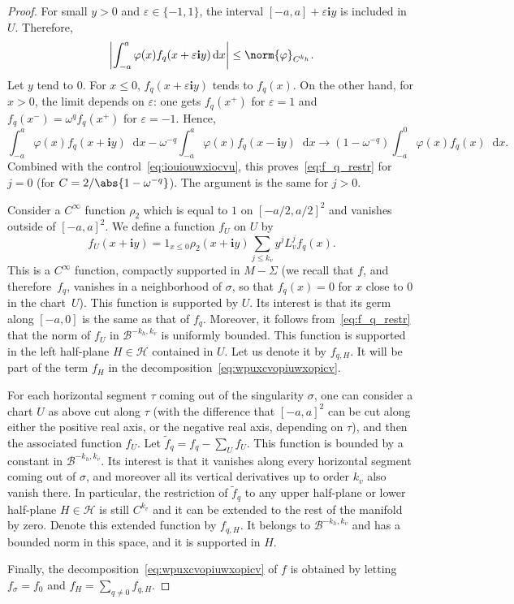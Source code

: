 \documentclass[JEP,XML,SOM,Unicode]{cedram}
\newcommand{\boH}{\mathcal{H}}
\newcommand{\boB}{\mathcal{B}}
\newcommand{\dd}{\mathop{}\!\mathrm{d}}
\newcommand{\ic}{\mathbf{i}}
\newcommand{\absgg}[1]{\biggl \lvert#1\biggr\rvert}
\let\epsilon\varepsilon
\let\phi\varphi
\theoremstyle{definition}
\numberwithin{equation}{section}
\begin{document}
\begin{proof}
For small $y>0$ and $\epsilon \in \{-1, 1\}$, the interval $[-a,a]+\epsilon
\ic y$ is included in $U$. Therefore,
\begin{equation}
\label{eq:iouiouwxiocvu}
\absgg{\int_{-a}^a \phi(x) f_q(x+\epsilon \ic y) \dd x} \leq \norm{\phi}_{C^{k_h}}.
\end{equation}
Let $y$ tend to $0$. For $x \leq 0$, $f_q(x+\epsilon \ic y)$ tends to
$f_q(x)$. On the other hand, for $x>0$, the limit depends on $\epsilon$: one
gets $f_q(x^+)$ for $\epsilon=1$ and $f_q(x^-) = \omega^q f_q(x^+)$ for
$\epsilon = -1$. Hence,
\begin{equation*}
\int_{-a}^a \phi(x) f_q(x+\ic y) \dd x - \omega^{-q} \int_{-a}^a \phi(x) f_q(x-\ic y) \dd x
\to (1-\omega^{-q}) \int_{-a}^0 \phi(x) f_q(x) \dd x.
\end{equation*}
Combined with the control~\eqref{eq:iouiouwxiocvu}, this
proves~\eqref{eq:f_q_restr} for $j=0$ (for $C=2/\abs{1-\omega^{-q}}$). The
argument is the same for $j>0$.

Consider a $C^\infty$ function $\rho_2$ which is equal to $1$ on $[-a/2,
a/2]^2$ and vanishes outside of $[-a,a]^2$. We define a function $f_U$ on $U$
by
\[
f_U(x+\ic y) = 1_{x\leq 0} \rho_2(x+\ic y) \sum_{j\leq k_v} y^j L_v^j
f_q(x).
\]
This is a $C^\infty$ function, compactly supported in $M-\Sigma$ (we
recall that $f$, and therefore~$f_q$, vanishes in a neighborhood of $\sigma$,
so that $f_q(x)=0$ for $x$ close to $0$ in the chart~$U$). This function is
supported by $U$. Its interest is that its germ along $[-a,0]$ is the same as
that of $f_q$. Moreover, it follows from~\eqref{eq:f_q_restr} that the norm
of $f_U$ in $\boB^{-k_h, k_v}$ is uniformly bounded. This function is
supported in the left half-plane $H \in \boH$ contained in $U$. Let us denote
it by $f_{q, H}$. It will be part of the term $f_H$ in the
decomposition~\eqref{eq:wpuxcvopiuwxopicv}.

For each horizontal segment $\tau$ coming out of the singularity $\sigma$,
one can consider a chart $U$ as above cut along $\tau$ (with the difference
that $[-a,a]^2$ can be cut along either the positive real axis, or the
negative real axis, depending on $\tau$), and then the associated function
$f_U$. Let $\tilde f_q = f_q -\sum_U f_U$. This function is bounded by a
constant in $\boB^{-k_h, k_v}$. Its interest is that it vanishes along every
horizontal segment coming out of $\sigma$, and moreover all its vertical
derivatives up to order $k_v$ also vanish there. In particular, the
restriction of $\tilde f_q$ to any upper half-plane or lower half-plane $H\in
\boH$ is still $C^{k_v}$ and it can be extended to the rest of the manifold
by zero. Denote this extended function by $f_{q, H}$. It belongs to
$\boB^{-k_h, k_v}$ and has a bounded norm in this space, and it is supported
in $H$.

Finally, the decomposition~\eqref{eq:wpuxcvopiuwxopicv} of $f$ is obtained by
letting $f_\sigma=f_0$ and $f_H = \sum_{q\neq 0} f_{q,H}$.
\end{proof}
\end{document}
